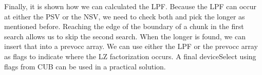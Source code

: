 Finally, it is shown how we can calculated the LPF. Because the LPF can occur at either the PSV or the NSV, we need to check both and pick the longer as mentioned before. Reaching the edge of the boundary of a chunk in the first search allows us to skip the second search. When the longer is found, we can insert that into a prevocc array. We can use either the LPF or the prevocc array as flags to indicate where the LZ factorization occurs. A final deviceSelect using flags from CUB can be used in a practical solution.
